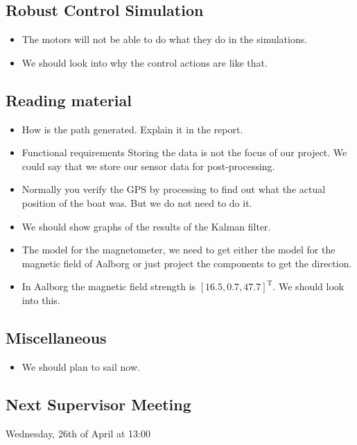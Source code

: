 \subsection{Robust Control Simulation}
\begin{itemize}
    \item The motors will not be able to do what they do in the simulations.
    \item We should look into why the control actions are like that.
\end{itemize}
\subsection{Reading material}
\begin{itemize}
	\item How is the path generated. Explain it in the report.
	\item Functional requirements Storing the data is not the focus of our project. We could say that we store our sensor data for post-processing.
	\item Normally you verify the GPS by processing to find out what the actual position of the boat was. But we do not need to do it.
	\item We should show graphs of the results of the Kalman filter.
	\item The model for the magnetometer, we need to get either the model for the magnetic field of Aalborg or just project the components to get the direction.
	\item In Aalborg the magnetic field strength is $[16.5,0.7,47.7]^\mathrm{T}$. We should look into this.
\end{itemize}
\subsection{Miscellaneous}
\begin{itemize}
    \item We should plan to sail now. 
\end{itemize}

\subsection{Next Supervisor Meeting}
Wednesday, 26th of April at 13:00
